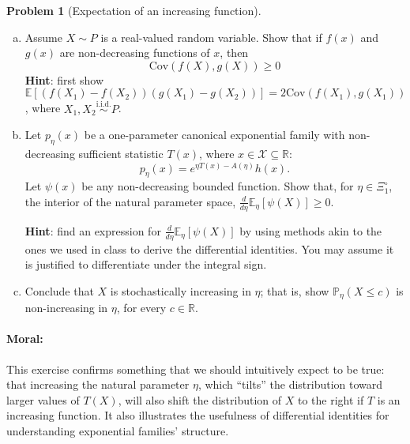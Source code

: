 \documentclass{article}
\newcommand{\cX}{\mathcal{X}}
\newcommand{\EE}{\mathbb{E}}
\newcommand{\PP}{\mathbb{P}}
\newcommand{\RR}{\mathbb{R}}
\newcommand{\simiid}{\overset{\text{i.i.d.}}{\sim}}
\theoremstyle{definition}
\newtheorem{problem}{Problem}
\begin{document}
\begin{problem}[Expectation of an increasing function]
\begin{enumerate}[(a)]
\item Assume $X\sim P$ is a real-valued random variable. Show that if $f(x)$ and $g(x)$ are non-decreasing functions of $x$, then 
\[
\text{Cov}(f(X),g(X)) \geq 0
\]
{\bf Hint}: first show $\EE\left[(f(X_1)-f(X_2))(g(X_1)-g(X_2))\right] = 2\text{Cov}(f(X_1),g(X_1))$, where $X_1,X_2\simiid P$.



\item Let $p_\eta(x)$ be a one-parameter canonical exponential family with non-decreasing sufficient statistic $T(x)$, where $x\in\cX\subseteq \RR$:
\[
p_\eta(x) = e^{\eta T(x) - A(\eta)}h(x).
\]
Let $\psi(x)$ be any non-decreasing bounded function. Show that, for $\eta\in\Xi_1^\circ$, the interior of the natural parameter space, $\frac{d}{d \eta}\EE_{\eta}[\psi(X)] \geq 0$.

{\bf Hint}: find an expression for $\frac{d}{d \eta} \EE_{\eta}[\psi(X)]$ by using methods akin to the ones we used in class to derive the differential identities. You may assume it is justified to differentiate under the integral sign.



\item Conclude that $X$ is stochastically increasing in $\eta$; that is, show $\PP_\eta(X \leq c)$ is non-increasing in $\eta$, for every $c \in \RR$.



\end{enumerate}

\paragraph{Moral:} This exercise confirms something that we should intuitively expect to be true: that increasing the natural parameter $\eta$, which ``tilts'' the distribution toward larger values of $T(X)$, will also shift the distribution of $X$ to the right if $T$ is an increasing function. It also illustrates the usefulness of differential identities for understanding exponential families' structure.
\end{problem}
\end{document}
